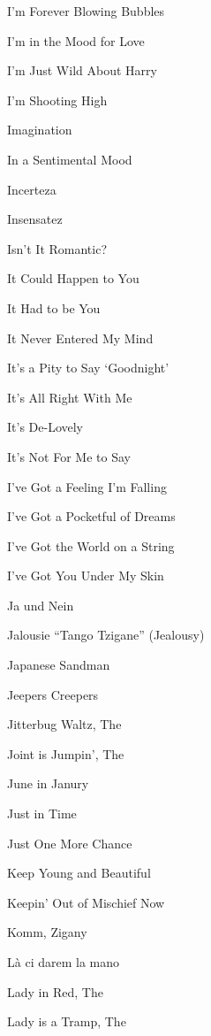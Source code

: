 \N I'm Forever Blowing Bubbles


\N {}


\N I'm in the Mood for Love


\N I'm Just Wild About Harry


\N I'm Shooting High


\N Imagination


\N In a Sentimental Mood


\N Incerteza


\N Insensatez


\N Isn't It Romantic?


\N {}


\N It Could Happen to You


\N It Had to be You


\N It Never Entered My Mind


\N It's a Pity to Say `Goodnight'


\N It's All Right With Me


\N It's De-Lovely


\N It's Not For Me to Say


\N I've Got a Feeling I'm Falling


\N I've Got a Pocketful of Dreams


\N I've Got the World on a String


\N I've Got You Under My Skin


\N Ja und Nein


\N Jalousie ``Tango Tzigane'' (Jealousy)


\N Japanese Sandman


\N Jeepers Creepers


\N Jitterbug Waltz, The


\N Joint is Jumpin', The


\N June in Janury


\N Just in Time


\N Just One More Chance


\N Keep Young and Beautiful


\N Keepin' Out of Mischief Now


\N Komm, Zigany


\N L{\`a} ci darem la mano


\N Lady in Red, The


\N Lady is a Tramp, The


